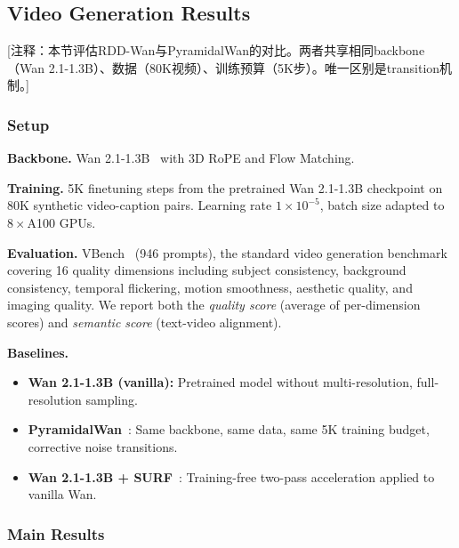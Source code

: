 
\subsection{Video Generation Results}
\label{sec:video_results}

\textcolor{green!50!black}{[注释：本节评估RDD-Wan与PyramidalWan的对比。两者共享相同backbone（Wan 2.1-1.3B）、数据（80K视频）、训练预算（5K步）。唯一区别是transition机制。]}

\subsubsection{Setup}

\textbf{Backbone.} Wan 2.1-1.3B~\citep{wan2025wan} with 3D RoPE and Flow Matching.

\textbf{Training.} 5K finetuning steps from the pretrained Wan 2.1-1.3B checkpoint on 80K synthetic video-caption pairs.
Learning rate $1 \times 10^{-5}$, batch size adapted to $8\times$A100 GPUs.

\textbf{Evaluation.} VBench~\citep{huang2024vbench} (946 prompts), the standard video generation benchmark covering 16 quality dimensions including subject consistency, background consistency, temporal flickering, motion smoothness, aesthetic quality, and imaging quality.
We report both the \emph{quality score} (average of per-dimension scores) and \emph{semantic score} (text-video alignment).

\textbf{Baselines.}
\begin{itemize}
    \item \textbf{Wan 2.1-1.3B (vanilla):} Pretrained model without multi-resolution, full-resolution sampling.
    \item \textbf{PyramidalWan}~\citep{liu2025pyramidalwan}: Same backbone, same data, same 5K training budget, corrective noise transitions.
    \item \textbf{Wan 2.1-1.3B + SURF}~\citep{xu2026surf}: Training-free two-pass acceleration applied to vanilla Wan.
\end{itemize}

\subsubsection{Main Results}

